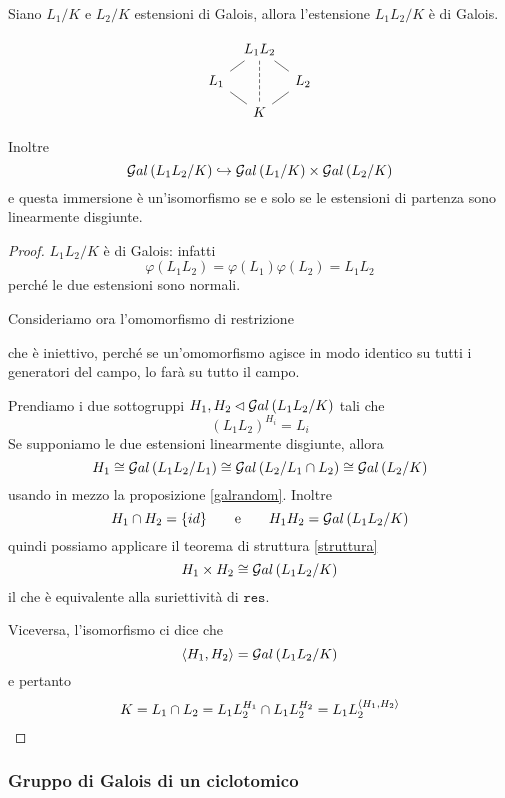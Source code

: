 \begin{multicols}{2}
	\begin{theorem}
		Siano $ L_1/K $ e $ L_2/K $ estensioni di Galois, allora l'estensione $ L_1L_2/K $ è di Galois. 
		
		\[\begin{tikzcd}[row sep=0.25cm, column sep=0.2cm]
		& L_1L_2 \arrow[dl,-] \arrow[dr,-] \arrow[dd, -, dashed] &  \\
		L_1 \arrow[dr,-] &  & L_2 \arrow [dl,-] \\
		& K &
		\end{tikzcd} \]
		
		Inoltre \[ \mathcal{G}al\left( L_1L_2/K \right) \hookrightarrow \mathcal{G}al\left( L_1/K \right) \times \mathcal{G}al\left( L_2/K \right) \]
		e questa immersione è un'isomorfismo se e solo se le estensioni di partenza sono linearmente disgiunte.
	\end{theorem}
	
	\begin{proof}
		$ L_1L_2/K $ è di Galois: infatti $$  \varphi(L_1L_2) = \varphi(L_1)\varphi(L_2) = L_1L_2  $$ perché le due estensioni sono normali.
		
		Consideriamo ora l'omomorfismo di restrizione
		
		che è iniettivo, perché se un'omomorfismo agisce in modo identico su tutti i generatori del campo, lo farà su tutto il campo.
	
	Prendiamo i due sottogruppi $ H_1, H_2 \lhd \mathcal{G}al\left( L_1L_2 /K \right) $ tali che
	\[ (L_1L_2)^{H_i} = L_i \]
	Se supponiamo le due estensioni linearmente disgiunte, allora
	\[ H_1 \cong \mathcal{G}al\left( L_1L_2/L_1 \right) \cong \mathcal{G}al\left( L_2/L_1 \cap L_2 \right) \cong \mathcal{G}al\left( L_2/K \right)  \]
	usando in mezzo la proposizione \ref{galrandom}. Inoltre
	\[ H_1 \cap H_2 = \{ id \} \qquad\text{e}\qquad H_1H_2 = \mathcal{G}al\left( L_1L_2 /K \right) \]
	quindi possiamo applicare il teorema di struttura \ref{struttura}
	\[ H_1 \times H_2 \cong \mathcal{G}al\left( L_1L_2/K \right) \]
	il che è equivalente alla suriettività di $ \texttt{res} $.
	
	Viceversa, l'isomorfismo ci dice che
	$$  \langle H_1, H_2 \rangle = \mathcal{G}al\left( L_1L_2/K \right)  $$
	e pertanto
	$$  K = L_1 \cap L_2 = L_1L_2^{H_1} \cap L_1L_2^{H_2} = L_1L_2^{\langle H_1, H_2 \rangle}  $$

\end{proof}
	
	\subsubsection{Gruppo di Galois di un ciclotomico}
	

\end{multicols}
